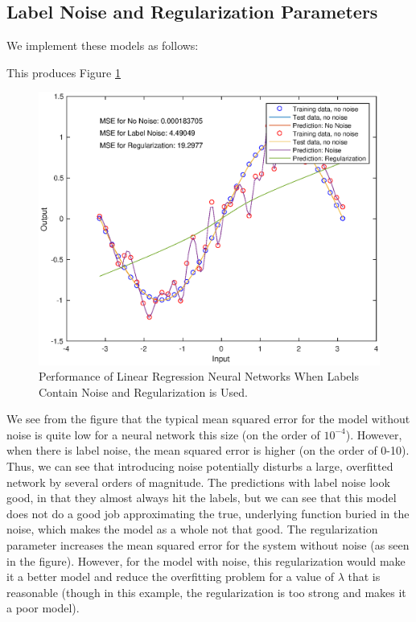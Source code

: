 \documentclass[11pt, oneside]{article}
\begin{document}
\subsection{Label Noise and Regularization Parameters}

We implement these models as follows:

This produces Figure \ref{fig:noiseAndReg}

\begin{figure}[ht!]
\includegraphics[width=1\textwidth]{Q2PartD.eps}
\caption{Performance of Linear Regression Neural Networks When Labels Contain Noise and Regularization is Used.}
\label{fig:noiseAndReg}
\end{figure}

We see from the figure that the typical mean squared error for the model without noise is quite low for a neural network this size (on the order of $10^{-4}$). However, when there is label noise, the mean squared error is higher (on the order of 0-10). Thus, we can see that introducing noise potentially disturbs a large, overfitted network by several orders of magnitude. The predictions with label noise look good, in that they almost always hit the labels, but we can see that this model does not do a good job approximating the true, underlying function buried in the noise, which makes the model as a whole not that good. The regularization parameter increases the mean squared error for the system without noise (as seen in the figure). However, for the model with noise, this regularization would make it a better model and reduce the overfitting problem for a value of $\lambda$ that is reasonable (though in this example, the regularization is too strong and makes it a poor model).
\end{document}
